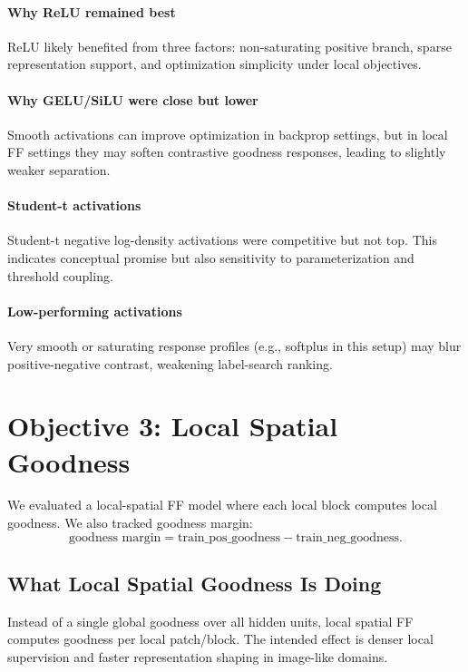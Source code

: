 \documentclass[sigconf]{acmart}
\begin{document}
\paragraph{Why ReLU remained best}
ReLU likely benefited from three factors: non-saturating positive branch, sparse representation support, and optimization simplicity under local objectives.

\paragraph{Why GELU/SiLU were close but lower}
Smooth activations can improve optimization in backprop settings, but in local FF settings they may soften contrastive goodness responses, leading to slightly weaker separation.

\paragraph{Student-t activations}
Student-t negative log-density activations were competitive but not top. This indicates conceptual promise but also sensitivity to parameterization and threshold coupling.

\paragraph{Low-performing activations}
Very smooth or saturating response profiles (e.g., softplus in this setup) may blur positive-negative contrast, weakening label-search ranking.

\section{Objective 3: Local Spatial Goodness}
We evaluated a local-spatial FF model where each local block computes local goodness. We also tracked goodness margin:
\begin{equation}
\text{goodness margin} = \text{train\_pos\_goodness} - \text{train\_neg\_goodness}.
\end{equation}

\subsection{What Local Spatial Goodness Is Doing}
Instead of a single global goodness over all hidden units, local spatial FF computes goodness per local patch/block. The intended effect is denser local supervision and faster representation shaping in image-like domains.
\end{document}
